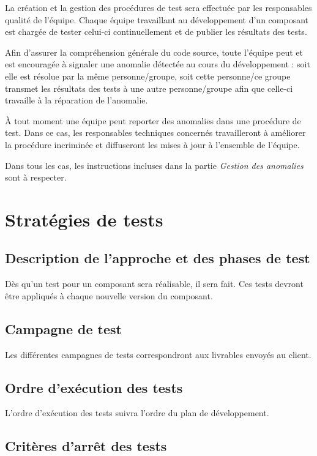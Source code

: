 \documentclass{../res/univ-projet}
\begin{document}
  La création et la gestion des procédures de test sera effectuée par les responsables qualité de l'équipe. Chaque équipe travaillant au développement d'un composant est chargée de tester celui-ci continuellement et de publier les résultats des tests.
  
  Afin d'assurer la compréhension générale du code source, toute l'équipe peut et est encouragée à signaler une anomalie détectée au cours du développement : soit elle est résolue par la même personne/groupe, soit cette personne/ce groupe transmet les résultats 
  des tests à une autre personne/groupe afin que celle-ci travaille à la réparation de l'anomalie.
  
  À tout moment une équipe peut reporter des anomalies dans une procédure de test. Dans ce cas, les responsables techniques concernés travailleront à améliorer la procédure incriminée et diffuseront les mises à jour à l'ensemble de l'équipe.

  Dans tous les cas, les instructions incluses dans la partie \emph{Gestion des anomalies} sont à respecter.


\section{Stratégies de tests}

\subsection{Description de l'approche et des phases de test}
Dès qu'un test pour un composant sera réalisable, il sera fait. Ces tests devront être appliqués à chaque nouvelle version du composant.


\subsection{Campagne de test}

Les différentes campagnes de tests correspondront aux livrables envoyés au client.

\subsection{Ordre d'exécution des tests}

L'ordre d'exécution des tests suivra l'ordre du plan de développement.

\subsection{Critères d'arrêt des tests}
\end{document}
